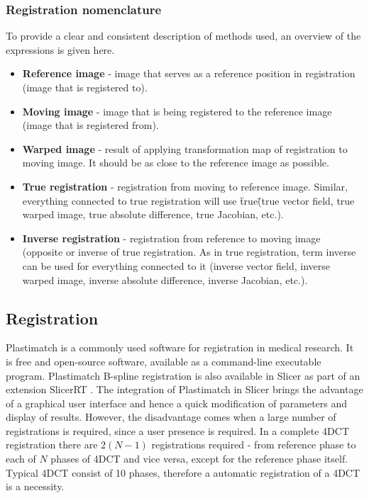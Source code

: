 \documentclass[type=dr, dr=rernat, accentcolor=tud7b,colorbacktitle, bigchapter, openright, twoside, 12pt ]{tudthesis}
\begin{document}
\newpage
\subsubsection{Registration nomenclature}

To provide a clear and consistent description of methods used, an overview of the expressions is given here.

\begin{itemize}
 \item \textbf{Reference image} - image that serves as a reference position in registration (image that is registered to).
 \item \textbf{Moving image} - image that is being registered to the reference image (image that is registered from).
 \item \textbf{Warped image} - result of applying transformation map of registration to moving image. It should be as close to the reference image as possible.
 \item \textbf{True registration} - registration from moving to reference image. Similar, everything connected to true registration will use \"true\" (true vector field, true warped image, true absolute difference, true Jacobian, etc.).
 \item \textbf{Inverse registration} - registration from reference to moving image (opposite or inverse of true registration. As in true registration, term inverse can be used for everything connected to it (inverse vector field, inverse warped image, inverse absolute difference, inverse Jacobian, etc.).
\end{itemize}


\subsection{Registration}
\label{RegistrationImplement}

Plastimatch \cite{Shackleford2010} is a commonly used software for registration in medical research. It is free and open-source software, available as a command-line executable program. 
Plastimatch B-spline registration is also available in Slicer as part of an extension SlicerRT \cite{Pinter2012}.
The integration of Plastimatch in Slicer brings the advantage of a graphical user interface and hence a quick modification of parameters and display of results. However, the disadvantage comes when a large number of registrations is required,
since a user presence is required. In a complete 4DCT registration there are $2(N-1)$ registrations required - from reference phase to each of $N$ phases of 4DCT and vice versa, except for the reference phase itself. 
Typical 4DCT consist of 10 phases, therefore a automatic registration of a 4DCT is a necessity.
\end{document}
